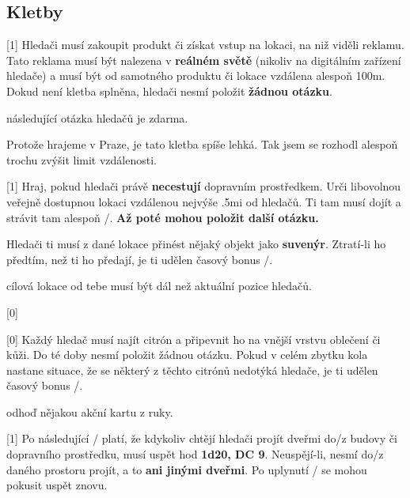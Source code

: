 \subsection{Kletby}\label{kletby}

\begin{cards}
	 Hledači musí zakoupit produkt či získat vstup na lokaci, na niž viděli reklamu. Tato reklama musí být nalezena v \textbf{reálném světě} (nikoliv na digitálním zařízení hledače) a musí být od samotného produktu či lokace vzdálena alespoň 100m. Dokud není kletba splněna, hledači nesmí položit \textbf{žádnou otázku}.
	
	\cost následující otázka hledačů je zdarma.
	
	\begin{reasoning}
		Protože hrajeme v Praze, je tato kletba spíše lehká. Tak jsem se rozhodl alespoň trochu zvýšit limit vzdálenosti.
	\end{reasoning}
	
	 Hraj, pokud hledači právě \textbf{necestují} dopravním prostředkem. Urči libovolnou veřejně dostupnou lokaci vzdálenou nejvýše \dist.5mi od hledačů. Ti tam musí dojít a strávit tam alespoň \timecursetravelvisit/. \textbf{Až poté mohou položit další otázku.}
	
	Hledači ti musí z dané lokace přinést nějaký objekt jako \textbf{suvenýr}. Ztratí-li ho předtím, než ti ho předají, je ti udělen časový bonus \timecursetravelpenalty/.
	
	\cost cílová lokace od tebe musí být dál než aktuální pozice hledačů.

	
	 Každý hledač musí najít citrón a připevnit ho na vnější vrstvu oblečení či kůži. Do té doby nesmí položit žádnou otázku. Pokud v celém zbytku kola nastane situace, že se některý z těchto citrónů nedotýká hledače, je ti udělen časový bonus \timecurselemonpenalty/.
	
	\cost odhoď nějakou akční kartu z ruky.
	
	 Po následující \timecursedoorduration/ platí, že kdykoliv chtějí hledači projít dveřmi do/z budovy či dopravního prostředku, musí uspět hod \textbf{1d20, DC 9}. Neuspějí-li, nesmí do/z daného prostoru projít, a to \textbf{ani jinými dveřmi}. Po uplynutí \timecursedoorreattempt/ se mohou pokusit uspět znovu.
	

\end{cards}
